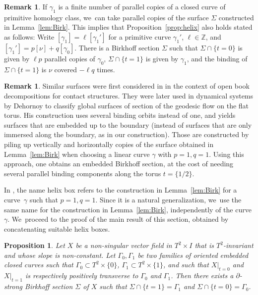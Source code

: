 \documentclass[JEP,XML,SOM,Unicode,NoEqCountersInSection,NoFloatCountersInSection,published]{cedram}
\newtheorem{prop}[theorem]{Proposition}
\theoremstyle{definition}
\newtheorem{Remark}[theorem]{Remark}
\begin{document}
\begin{Remark}\label{rem:Multcurv}
If $\gamma_1$ is a finite number of parallel copies of a closed curve of primitive homology class, we~can take parallel copies of the surface $\Sigma$ constructed in Lemma~\ref{lem:Birk}. This implies that Proposition~\ref{prop:helix} also holds stated as follows: Write $[\gamma_1]=\ell [\gamma_1']$ for a primitive curve $\gamma_1'$, $\ell \in \mathbb{Z}$, and $[\gamma_1']=p[\nu] + q [\gamma_0]$. There is a Birkhoff section $\Sigma$ such that $\Sigma\cap \{t=0\}$ is given by $\ell p$ parallel copies of $\gamma_0$, $\Sigma\cap \{t=1\}$ is given by $\gamma_1$, and the binding of $\Sigma\cap \{t=1\}$ is $\nu$ covered $-\ell q$ times.
\end{Remark}

\begin{Remark}\label{rem:embDeh}
Similar surfaces were first considered in \cite{VHM} in the context of open book decompositions for contact structures. They were later used in dynamical systems by Dehornoy \cite{Deh, Deh2} to classify global surfaces of section of the geodesic flow on the flat torus. His construction uses several binding orbits instead of one, and yields surfaces that are embedded up to the boundary (instead of surfaces that are only immersed along the boundary, as in our construction). Those are constructed by piling up vertically and horizontally copies of the surface obtained in Lemma~\ref{lem:Birk} when choosing a linear curve $\gamma$ with $p=1,q=1$. Using this approach, one obtains an embedded Birkhoff section, at the cost of needing several parallel binding components along the torus $t=\{1/2\}$.

In \cite{Deh, Deh2}, the name helix box refers to the construction in Lemma~\ref{lem:Birk} for a curve~$\gamma$ such that $p=1,q=1$. Since it is a natural generalization, we~use the same name for the construction in Lemma~\ref{lem:Birk}, independently of the curve $\gamma$. We~proceed to the proof of the main result of this section, obtained by concatenating suitable helix boxes.
\end{Remark}

\begin{prop}\label{prop:BirkT2}
Let $X$ be a non-singular vector field in $T^2\times I$ that is $T^2$-invariant and whose slope is non-constant. Let $\Gamma_0,\Gamma_1$ be two families of oriented embedded closed curves such that $\Gamma_0 \subset T^2\times \{0\}$, $\Gamma_1\subset T^2\times \{1\}$, and such that $X|_{t=0}$ and $X|_{t=1}$ is respectively positively transverse to $\Gamma_0$ and $\Gamma_1$. Then there exists a $\partial$-strong Birkhoff section $\Sigma$ of $X$ such that $\Sigma \cap \{t=1\}=\Gamma_1$ and $\Sigma \cap \{t=0\}=\Gamma_0$.
\end{prop}
\end{document}
